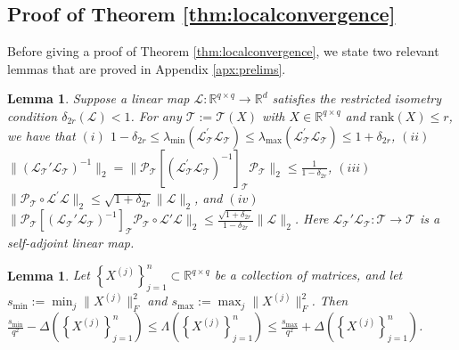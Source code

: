 \documentclass[11pt,letterpaper]{article}
\newtheorem{lemma}[theorem]{Lemma}
\newcommand{\R}{\mathbb{R}}
\renewcommand{\L}{\mathcal{L}}
\newcommand{\ct}{\mathcal{T}}
\newcommand{\cp}{\mathcal{P}}
\begin{document}
\subsection{Proof of Theorem \ref{thm:localconvergence}} \label{sec:analysis_maintheoremproof}

Before giving a proof of Theorem \ref{thm:localconvergence}, we state two relevant lemmas that are proved in Appendix \ref{apx:prelims}.

\begin{lemma}\label{thm:weakincoherencebound}
	Suppose a linear map $\L : \R^{q \times q} \rightarrow \R^d$ satisfies the restricted isometry condition $\delta_{2r}(\L) <1$.  For any $\ct:= \ct(X)$ with $X \in \R^{q \times q}$ and $\mathrm{rank}(X) \leq r$, we have that $(i)$ $1-\delta_{2r}\leq \lambda_{\min}(\mathcal{L}^{\prime}_{\ct} \mathcal{L}_{\ct}) \leq \lambda_{\max}(\mathcal{L}^{\prime}_{\ct} \mathcal{L}_{\ct}) \leq 1+\delta_{2r}$, $(ii)$ $\| (\L_\ct' \L_{\ct})^{-1} \|_{2}=\| \cp_{\ct} [(\mathcal{L}_{\ct}^{\prime} \mathcal{L}_{\ct})^{-1}]_{\ct} \cp_{\ct} \|_{2} \leq \frac{1}{1-\delta_{2r}} $, $(iii)$ $\| \cp_\ct \circ \L^{\prime} \L\|_{2} \leq \sqrt{1+\delta_{2r}}\|\L\|_2$, and $(iv)$ $\|\cp_\ct [(\L_{\ct}' \L_{\ct})^{-1}]_\ct \cp_\ct \allowbreak \circ \L' \L\|_{2} \leq \frac{\sqrt{1+\delta_{2r}}}{1-\delta_{2r}}\|\L\|_2$.  Here $\L_\ct' \L_\ct : \ct \rightarrow \ct$ is a self-adjoint linear map.
\end{lemma}

\begin{lemma}\label{thm:boundondelta}
Let $\left\{X^{(j)}\right\}_{j=1}^{n} \subset \mathbb{R}^{q\times q}$ be a collection of matrices, and let $s_{\min}:= \min_{j} \|X^{(j)}\|_F^2$ and $s_{\max}:=\max_{j} \|X^{(j)}\|_F^2$.  Then $\frac{s_{\min}}{q^2} - \Delta\left(\left\{X^{(j)}\right\}_{j=1}^{n}\right) \leq \Lambda \left(\left\{X^{(j)}\right\}_{j=1}^{n}\right) \leq \frac{s_{\max}}{q^2} + \Delta\left(\left\{X^{(j)}\right\}_{j=1}^{n}\right)$.
\end{lemma}
\end{document}
